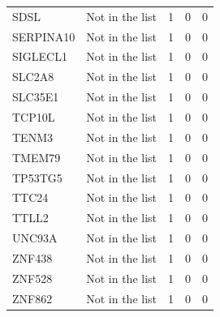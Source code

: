 \documentclass[12pt,twoside]{reedthesis}
\theoremstyle{definition}
\theoremstyle{definition}
\theoremstyle{remark}
\begin{document}
\begin{longtable}[t]{llrrr}
  SDSL & Not in the list & 1 & 0 & 0\\
  SERPINA10 & Not in the list & 1 & 0 & 0\\
  SIGLECL1 & Not in the list & 1 & 0 & 0\\
  SLC2A8 & Not in the list & 1 & 0 & 0\\
  \addlinespace
  SLC35E1 & Not in the list & 1 & 0 & 0\\
  TCP10L & Not in the list & 1 & 0 & 0\\
  TENM3 & Not in the list & 1 & 0 & 0\\
  TMEM79 & Not in the list & 1 & 0 & 0\\
  TP53TG5 & Not in the list & 1 & 0 & 0\\
  \addlinespace
  TTC24 & Not in the list & 1 & 0 & 0\\
  TTLL2 & Not in the list & 1 & 0 & 0\\
  UNC93A & Not in the list & 1 & 0 & 0\\
  ZNF438 & Not in the list & 1 & 0 & 0\\
  ZNF528 & Not in the list & 1 & 0 & 0\\
  ZNF862 & Not in the list & 1 & 0 & 0\\
  \bottomrule
  \end{longtable}
  
  \newpage
  
\end{document}

